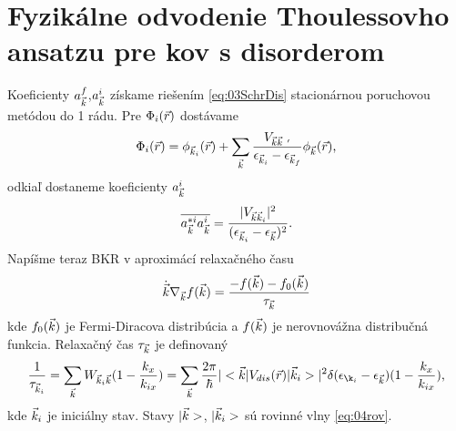 \section{Fyzikálne odvodenie Thoulessovho ansatzu pre kov s disorderom}
\label{sec:thouless}
Koeficienty $a^f_{\vec{k}}$,$a^i_{\vec{k}}$ získame riešením \eqref{eq:03SchrDis} stacionárnou poruchovou metódou do 1 rádu. Pre $\Phi_i(\vec{r})$ dostávame
\begin{align}
\Phi_i(\vr)=\phi_{\vk_i}(\vr)+\sum_{\vk}\frac{V_{\vk\vk\ '}}{\epsilon_{\vk_i}-\epsilon_{\vk_f}}\phi_{\vk}(\vr)\text{,}
\end{align}
odkiaľ dostaneme koeficienty $a^i_{\vec{k}}$
\begin{align}
\label{eq:04coef}
\overline{a^{*i}_{\vec{k}}a^i_{\vec{k}}}=\frac{|V_{\vec{k}\vec{k}_i}|^2}{(\epsilon_{\vec{k}_i}-\epsilon_{\vec{k}})^2}\text{.}
\end{align}
Napíšme teraz BKR v aproximácí relaxačného času 
\begin{align}
\dot{\vec{k}}\nabla_{\vec{k}}f(\vec{k})=\frac{-f(\vec{k})-f_0(\vec{k})}{\tau_{\vec{k}}}
\end{align}
kde $f_0(\vec{k})$ je Fermi-Diracova distribúcia a $f(\vec{k})$ je nerovnovážna distribučná funkcia. Relaxačný čas  $\tau_{\vec{k}}$ je definovaný
\begin{align}
\label{eq:04goldenrule}
\frac{1}{\tau_{\vk_i}}=\sum_{\vk}W_{\vk_i\vk}(1-\frac{k_x}{k_{ix}}) = \sum_{\vk}\frac{2\pi}{\hbar}|\bra{\vk}V_{dis}(\vr)\ket{\vk_i}|^2\delta(\epsilon_{\k_i}-\epsilon_{\vk})(1-\frac{k_x}{k_{ix}}) \text{,}
\end{align}
kde $\vec{k}_i$ je iniciálny stav. Stavy $|\vec{k}>$, $|\vec{k}_i>$ sú rovinné vlny \eqref{eq:04rov}.

